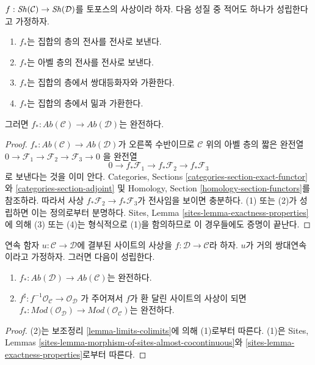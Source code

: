 \begin{lemma}
\label{lemma-exactness}
$f : \mathop{\mathit{Sh}}\nolimits(\mathcal{C}) \to \mathop{\mathit{Sh}}\nolimits(\mathcal{D})$를 토포스의 사상이라 하자.
다음 성질 중 적어도 하나가 성립한다고 가정하자.
\begin{enumerate}
\item $f_*$는 집합의 층의 전사를 전사로 보낸다.
\item $f_*$는 아벨 층의 전사를 전사로 보낸다.
\item $f_*$는 집합의 층에서 쌍대등화자와 가환한다.
\item $f_*$는 집합의 층에서 밂과 가환한다.
\end{enumerate}
그러면 $f_* : \textit{Ab}(\mathcal{C}) \to \textit{Ab}(\mathcal{D})$는
완전하다.
\end{lemma}

\begin{proof}
$f_* : \textit{Ab}(\mathcal{C}) \to \textit{Ab}(\mathcal{D})$가 오른쪽
수반이므로 $\mathcal{C}$ 위의 아벨 층의 짧은 완전열
$0 \to \mathcal{F}_1 \to \mathcal{F}_2 \to \mathcal{F}_3 \to 0$
을 완전열
$$
0 \to f_*\mathcal{F}_1 \to f_*\mathcal{F}_2 \to f_*\mathcal{F}_3
$$
로 보낸다는 것을 이미 안다. Categories, Sections
\ref{categories-section-exact-functor}와
\ref{categories-section-adjoint}
및 Homology, Section \ref{homology-section-functors}를 참조하라.
따라서 사상 $f_*\mathcal{F}_2 \to f_*\mathcal{F}_3$가 전사임을
보이면 충분하다. (1) 또는 (2)가 성립하면 이는 정의로부터 분명하다.
Sites, Lemma \ref{sites-lemma-exactness-properties}에 의해 (3) 또는 (4)는
형식적으로 (1)을 함의하므로 이 경우들에도 증명이 끝난다.
\end{proof}

\begin{lemma}
\label{lemma-morphism-ringed-sites-almost-cocontinuous}
연속 함자 $u : \mathcal{C} \to \mathcal{D}$에 결부된 사이트의 사상을
$f : \mathcal{D} \to \mathcal{C}$라 하자. $u$가 거의 쌍대연속이라고
가정하자. 그러면 다음이 성립한다.
\begin{enumerate}
\item $f_* : \textit{Ab}(\mathcal{D}) \to \textit{Ab}(\mathcal{C})$는 완전하다.
\item $f^\sharp : f^{-1}\mathcal{O}_\mathcal{C} \to \mathcal{O}_\mathcal{D}$
가 주어져서 $f$가 환 달린 사이트의 사상이 되면
$f_* : \textit{Mod}(\mathcal{O}_\mathcal{D}) \to
\textit{Mod}(\mathcal{O}_\mathcal{C})$는 완전하다.
\end{enumerate}
\end{lemma}

\begin{proof}
(2)는 보조정리 \ref{lemma-limits-colimits}에 의해 (1)로부터 따른다.
(1)은 Sites, Lemmas
\ref{sites-lemma-morphism-of-sites-almost-cocontinuous}와
\ref{sites-lemma-exactness-properties}로부터 따른다.
\end{proof}





